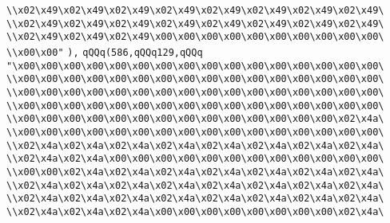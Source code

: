 \verb|\\x02\x49\x02\x49\x02\x49\x02\x49\x02\x49\x02\x49\x02\x49\x02\x49\|\newline
\verb|\\x02\x49\x02\x49\x02\x49\x02\x49\x02\x49\x02\x49\x02\x49\x02\x49\|\newline
\verb|\\x02\x49\x02\x49\x02\x49\x00\x00\x00\x00\x00\x00\x00\x00\x00\x00\|\newline
\verb|\\x00\x00"|\newline
\verb|),|\newline
\verb|qQQq(586,qQQq129,qQQq|\newline
\verb|"\x00\x00\x00\x00\x00\x00\x00\x00\x00\x00\x00\x00\x00\x00\x00\x00\|\newline
\verb|\\x00\x00\x00\x00\x00\x00\x00\x00\x00\x00\x00\x00\x00\x00\x00\x00\|\newline
\verb|\\x00\x00\x00\x00\x00\x00\x00\x00\x00\x00\x00\x00\x00\x00\x00\x00\|\newline
\verb|\\x00\x00\x00\x00\x00\x00\x00\x00\x00\x00\x00\x00\x00\x00\x00\x00\|\newline
\verb|\\x00\x00\x00\x00\x00\x00\x00\x00\x00\x00\x00\x00\x00\x00\x02\x4a\|\newline
\verb|\\x00\x00\x00\x00\x00\x00\x00\x00\x00\x00\x00\x00\x00\x00\x00\x00\|\newline
\verb|\\x02\x4a\x02\x4a\x02\x4a\x02\x4a\x02\x4a\x02\x4a\x02\x4a\x02\x4a\|\newline
\verb|\\x02\x4a\x02\x4a\x00\x00\x00\x00\x00\x00\x00\x00\x00\x00\x00\x00\|\newline
\verb|\\x00\x00\x02\x4a\x02\x4a\x02\x4a\x02\x4a\x02\x4a\x02\x4a\x02\x4a\|\newline
\verb|\\x02\x4a\x02\x4a\x02\x4a\x02\x4a\x02\x4a\x02\x4a\x02\x4a\x02\x4a\|\newline
\verb|\\x02\x4a\x02\x4a\x02\x4a\x02\x4a\x02\x4a\x02\x4a\x02\x4a\x02\x4a\|\newline
\verb|\\x02\x4a\x02\x4a\x02\x4a\x00\x00\x00\x00\x00\x00\x00\x00\x02\x4a\|\newline
